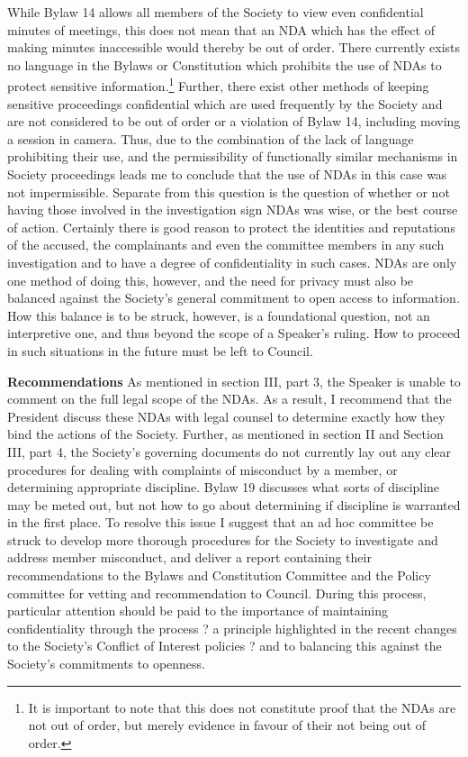 \begin{multicols}{2}
\begin{longenum}[ label*=\arabic*., align=left]
\begin{longenum}
While Bylaw 14 allows all members of the Society to view even confidential minutes of meetings, this does not mean that an NDA which has the effect of making minutes inaccessible would thereby be out of order. There currently exists no language in the Bylaws or Constitution which prohibits the use of NDAs to protect sensitive information.\footnote{It is important to note that this does not constitute proof that the NDAs are not out of order, but merely evidence in favour of their not being out of order.}  Further, there exist other methods of keeping sensitive proceedings confidential which are used frequently by the Society and are not considered to be out of order or a violation of Bylaw 14, including moving a session in camera. Thus, due to the combination of the lack of language prohibiting their use, and the permissibility of functionally similar mechanisms in Society proceedings leads me to conclude that the use of NDAs in this case was not impermissible.
Separate from this question is the question of whether or not having those involved in the investigation sign NDAs was wise, or the best course of action. Certainly there is good reason to protect the identities and reputations of the accused, the complainants and even the committee members in any such investigation and to have a degree of confidentiality in such cases. NDAs are only one method of doing this, however, and the need for privacy must also be balanced against the Society's general commitment to open access to information. How this balance is to be struck, however, is a foundational question, not an interpretive one, and thus beyond the scope of a Speaker's ruling. How to proceed in such situations in the future must be left to Council.
\end{longenum}
\item \textbf{Recommendations}
As mentioned in section III, part 3, the Speaker is unable to comment on the full legal scope of the NDAs. As a result, I recommend that the President discuss these NDAs with legal counsel to determine exactly how they bind the actions of the Society.
Further, as mentioned in section II and Section III, part 4, the Society's governing documents do not currently lay out any clear procedures for dealing with complaints of misconduct by a member, or determining appropriate discipline. Bylaw 19 discusses what sorts of discipline may be meted out, but not how to go about determining if discipline is warranted in the first place. To resolve this issue I suggest that an ad hoc committee be struck to develop more thorough procedures for the Society to investigate and address member misconduct, and deliver a report containing their recommendations to the Bylaws and Constitution Committee and the Policy committee for vetting and recommendation to Council. During this process, particular attention should be paid to the importance of maintaining confidentiality through the process ? a principle highlighted in the recent changes to the Society's Conflict of Interest policies ? and to balancing this against the Society's commitments to openness.


\end{longenum}
\end{multicols}
